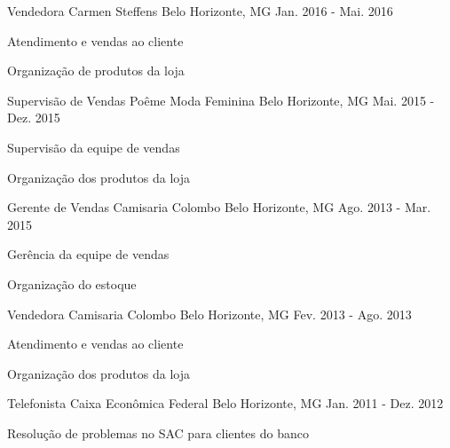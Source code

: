 
  \cventry
    {Vendedora}
    {Carmen Steffens}
    {Belo Horizonte, MG}
    {Jan. 2016 - Mai. 2016}
    {
      \begin{cvitems}
        \item {Atendimento e vendas ao cliente}
        \item {Organização de produtos da loja}
      \end{cvitems}
    }
  

  \cventry
    {Supervisão de Vendas}
    {Poême Moda Feminina}
    {Belo Horizonte, MG}
    {Mai. 2015 - Dez. 2015}
    {
      \begin{cvitems}
        \item {Supervisão da equipe de vendas}
        \item {Organização dos produtos da loja}
      \end{cvitems}
    }


  \cventry
    {Gerente de Vendas}
    {Camisaria Colombo}
    {Belo Horizonte, MG}
    {Ago. 2013 - Mar. 2015}
    {
      \begin{cvitems}
        \item {Gerência da equipe de vendas}
        \item {Organização do estoque}
      \end{cvitems}
    }


  \cventry
    {Vendedora}
    {Camisaria Colombo}
    {Belo Horizonte, MG}
    {Fev. 2013 - Ago. 2013}
    {
      \begin{cvitems}
        \item {Atendimento e vendas ao cliente}
        \item {Organização dos produtos da loja}
      \end{cvitems}
    }



  \cventry
    {Telefonista}
    {Caixa Econômica Federal}
    {Belo Horizonte, MG}
    {Jan. 2011 - Dez. 2012}
    {
      \begin{cvitems}
        \item {Resolução de problemas no SAC para clientes do banco}
      \end{cvitems} 
    }

